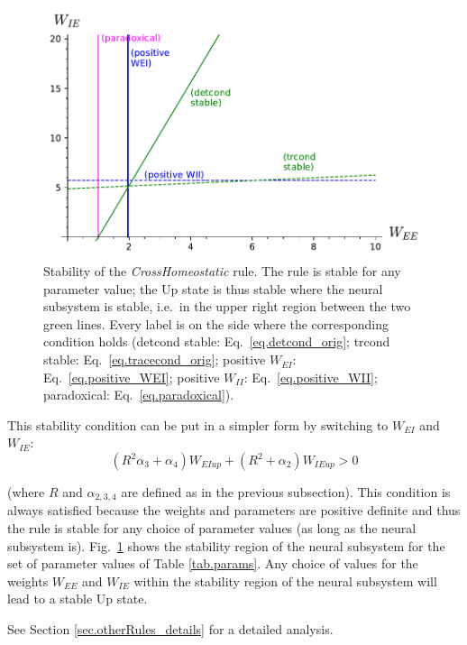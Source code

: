 \documentclass[twocolumn]{article}
\newcommand{\EE}{\mathit{EE}}
\newcommand{\EI}{\mathit{EI}}
\newcommand{\IE}{\mathit{IE}}
\newcommand{\II}{\mathit{II}}
\newcommand{\up}{\mathit{up}}
\begin{document}
\begin{figure}[ht]
\centering
\includegraphics[width=\linewidth]{CH_stability}
\caption{Stability of the {\em CrossHomeostatic} rule. The rule is stable for any parameter value; the Up state is thus stable where the neural subsystem is stable, i.e.\ in the upper right region between the two green lines. Every label is on the side where the corresponding condition  holds (detcond stable: Eq.\ \ref{eq.detcond_orig}; trcond stable: Eq.\ \ref{eq.tracecond_orig}; positive $W_{\EI}$: Eq.\ \ref{eq.positive_WEI}; positive $W_{\II}$: Eq.\ \ref{eq.positive_WII}; paradoxical: Eq.\ \ref{eq.paradoxical}).}
\label{fig.CH_stability}
\end{figure}




This stability condition can be put in a simpler form by switching to $W_{\EI}$ and $W_{\IE}$:
\begin{equation}
(R^2 \alpha_3 + \alpha_4) W_{\EI\up} + (R^2 + \alpha_2) W_{\IE\up} > 0
\label{eq.CH_stable_cond_v2}
\end{equation}

\noindent (where $R$ and $\alpha_{2,3,4}$ are defined as in the previous subsection). This condition is always satisfied because the weights and parameters are positive definite and thus the rule is stable for any choice of parameter values (as long as the neural subsystem is). Fig.\ \ref{fig.CH_stability} shows the stability region of the neural subsystem for the set of parameter values of Table \ref{tab.params}. Any choice of values for the weights $W_{\EE}$ and $W_{\IE}$ within the stability region of the neural subsystem will lead to a stable Up state.

See Section \ref{sec.otherRules_details} for a detailed analysis.
\end{document}
